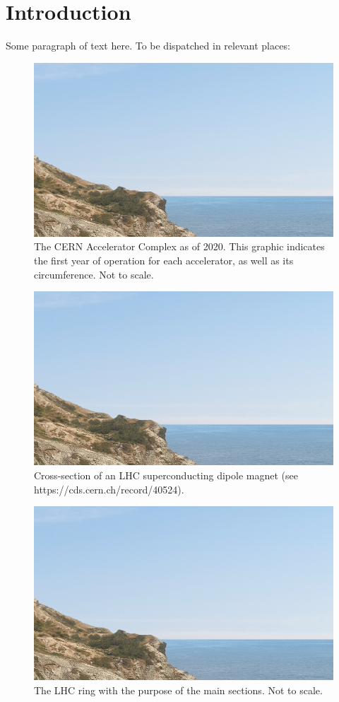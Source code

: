 
\chapter*{Introduction}

\label{Introduction} %


Some paragraph of text here.
To be dispatched in relevant places:

\begin{figure}[h]
  \centering
  \includegraphics*[width=0.5\columnwidth]{Figures/placeholder.png}
  \caption{The CERN Accelerator Complex as of 2020. This graphic indicates the first year of operation for each accelerator, as well as its circumference. Not to scale.}
  \label{fig:cern_accelerator_complex}
\end{figure}


\begin{figure}[h]
  \centering
  \includegraphics*[width=0.5\columnwidth]{Figures/placeholder.png}
  \caption{Cross-section of an LHC superconducting dipole magnet (see https://cds.cern.ch/record/40524).}
  \label{fig:lhc_dipole_crosssection}
\end{figure}


\begin{figure}[h]
  \centering
  \includegraphics*[width=0.5\columnwidth]{Figures/placeholder.png}
  \caption{The LHC ring with the purpose of the main sections. Not to scale.}
  \label{fig:lhc_ring_sections}
\end{figure}

